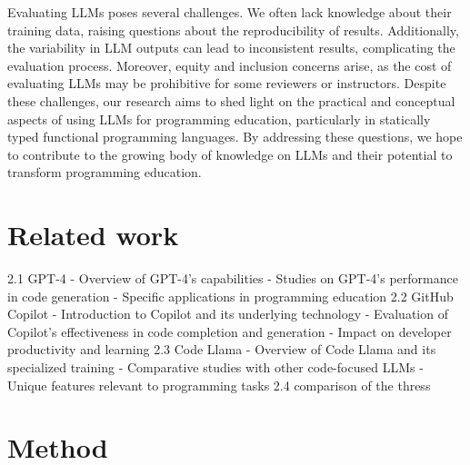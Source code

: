 \documentclass[sigconf,authordraft]{acmart}
\begin{document}
Evaluating LLMs poses several challenges. We often lack knowledge about their training data, raising questions about the reproducibility of results. Additionally, the variability in LLM outputs can lead to inconsistent results, complicating the evaluation process. Moreover, equity and inclusion concerns arise, as the cost of evaluating LLMs may be prohibitive for some reviewers or instructors. Despite these challenges, our research aims to shed light on the practical and conceptual aspects of using LLMs for programming education, particularly in statically typed functional programming languages. By addressing these questions, we hope to contribute to the growing body of knowledge on LLMs and their potential to transform programming education.

\section{Related work}

2.1 GPT-4
- Overview of GPT-4's capabilities
- Studies on GPT-4's performance in code generation
- Specific applications in programming education
2.2 GitHub Copilot
- Introduction to Copilot and its underlying technology
- Evaluation of Copilot's effectiveness in code completion and generation
- Impact on developer productivity and learning
2.3 Code Llama
- Overview of Code Llama and its specialized training
- Comparative studies with other code-focused LLMs
- Unique features relevant to programming tasks
2.4 comparison of the thress

\section{Method}



\end{document}
